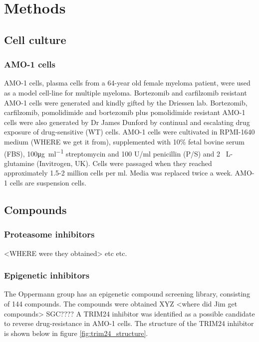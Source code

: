 \chapter{\label{ch:3-methods}Methods}


\section{Cell culture}
\subsection{AMO-1 cells}
AMO-1 cells, plasma cells from a 64-year old female myeloma patient, were used as a model cell-line for multiple myeloma.
Bortezomib and carfilzomib resistant AMO-1 cells were generated and kindly gifted by the Driessen lab\cite{soriano2016proteasome}.
Bortezomib, carfilzomib, pomolidimide and bortezomib plus pomolidimide resistant AMO-1 cells were also generated by Dr James Dunford by continual and escalating drug exposure of drug-sensitive (WT) cells.
AMO-1 cells were cultivated in RPMI-1640 medium (WHERE we get it from), supplemented with 10\% fetal bovine serum (FBS), 100\si{\ug\per\ml} streptomycin and 100 U/ml penicillin (P/S) and 2\si{\milli\Molar} L-glutamine (Invitrogen, UK).
Cells were passaged when they reached approximately 1.5-2 million cells per \si{\ml}.
Media was replaced twice a week.
AMO-1 cells are suspension cells.

\section{Compounds}

\subsection{Proteasome inhibitors}
<WHERE were they obtained> etc etc.

\subsection{Epigenetic inhibitors}
The Oppermann group has an epigenetic compound screening library, consisting of 144 compounds.
The compounds were obtained XYZ <where did Jim get compounds> SGC????
A TRIM24 inhibitor was identified as a possible candidate to reverse drug-resistance in AMO-1 cells.
The structure of the TRIM24 inhibitor is shown below in figure \ref{fig:trim24_structure}.

